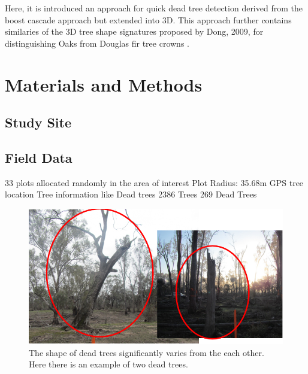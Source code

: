 \documentclass{subfiles}
\begin{document}
Here, it is introduced an approach for quick dead tree detection derived from the boost cascade approach \cite{Viola2001} but extended into 3D. This approach further contains similaries of the 3D tree shape signatures proposed by Dong, 2009, for distinguishing Oaks from Douglas fir tree crowns \cite{Dong2009}. 




\section{Materials and Methods}

\subsection{Study Site}


\subsection{Field Data}

33 plots allocated randomly in the area of interest
Plot Radius: 35.68m 
GPS tree location
Tree information like Dead trees
2386 Trees 
269 Dead Trees

\begin{figure} [h!]
	\centering
	\includegraphics[width=\textwidth]{img/DeadTreesExamplePhotos}
	\caption{The shape of dead trees significantly varies from the each other. Here there is an example of two dead trees.}
	\label{fig:DeadTreesExamplePhotos}
\end{figure}
\end{document}
